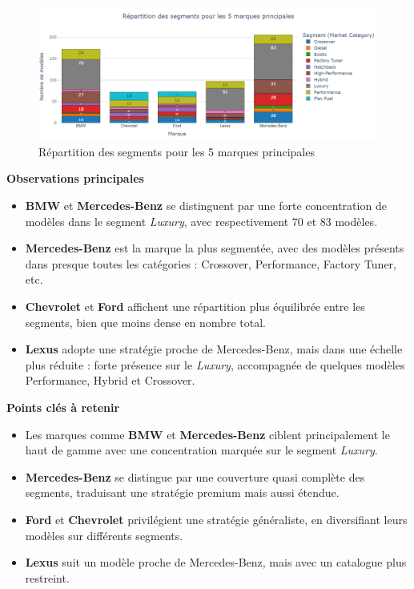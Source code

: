 \documentclass[12pt]{report}
\begin{document}
\begin{figure}[H]
    \centering
    \includegraphics[width=1\textwidth]{Marque_nbmodele.png}
    \caption{Répartition des segments pour les 5 marques principales}
    \label{fig:marque-nbmodele}
\end{figure}

\vspace{1em}
\textbf{Observations principales}
\begin{itemize}
    \item \textbf{BMW} et \textbf{Mercedes-Benz} se distinguent par une forte concentration de modèles dans le segment \textit{Luxury}, avec respectivement 70 et 83 modèles.
    \item \textbf{Mercedes-Benz} est la marque la plus segmentée, avec des modèles présents dans presque toutes les catégories : Crossover, Performance, Factory Tuner, etc.
    \item \textbf{Chevrolet} et \textbf{Ford} affichent une répartition plus équilibrée entre les segments, bien que moins dense en nombre total.
    \item \textbf{Lexus} adopte une stratégie proche de Mercedes-Benz, mais dans une échelle plus réduite : forte présence sur le \textit{Luxury}, accompagnée de quelques modèles Performance, Hybrid et Crossover.
\end{itemize}

\vspace{1em}
\textbf{Points clés à retenir}
\begin{itemize}
    \item Les marques comme \textbf{BMW} et \textbf{Mercedes-Benz} ciblent principalement le haut de gamme avec une concentration marquée sur le segment \textit{Luxury}.
    \item \textbf{Mercedes-Benz} se distingue par une couverture quasi complète des segments, traduisant une stratégie premium mais aussi étendue.
    \item \textbf{Ford} et \textbf{Chevrolet} privilégient une stratégie généraliste, en diversifiant leurs modèles sur différents segments.
    \item \textbf{Lexus} suit un modèle proche de Mercedes-Benz, mais avec un catalogue plus restreint.
\end{itemize}
\end{document}
